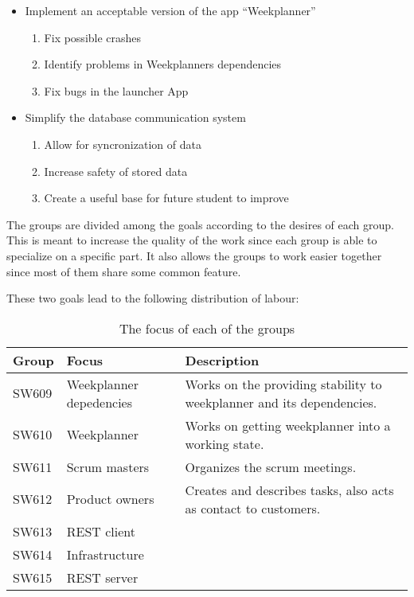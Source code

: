 \begin{itemize}
  \item Implement an acceptable version of the app ``Weekplanner''
  	\begin{enumerate}
  		\item Fix possible crashes
  		\item Identify problems in Weekplanners dependencies
  		\item Fix bugs in the launcher App
	\end{enumerate}
  \item Simplify the database communication system
   	\begin{enumerate}
  		\item Allow for syncronization of data
  		\item Increase safety of stored data
  		\item Create a useful base for future student to improve
	\end{enumerate}
\end{itemize}





The groups are divided among the goals according to the desires of each group.
This is meant to increase the quality of the work since each group is able to
specialize on a specific part. It also allows the groups to work easier together
since most of them share some common feature.

 These two goals lead to the
following distribution of labour:

\begin{table}[H]
\centering
\begin{tabular}{|p{2cm}|p{3cm}|p{8cm}|}
\hline
Group & Focus & Description \\ \hline
SW609 & Weekplanner depedencies & Works on the providing stability to
weekplanner and its dependencies.\\\hline 
SW610 & Weekplanner & Works on getting weekplanner into a working
state.\\
\hline SW611 & Scrum masters & Organizes the scrum meetings. \\\hline 
SW612 & Product owners & Creates and describes tasks, also acts as contact to
customers. \\\hline 
SW613 & REST client & \\ \hline

SW614 & Infrastructure & \\ \hline

SW615 & REST server & \\ \hline

\end{tabular}
\caption{The focus of each of the groups}
\label{GroupDivision}
\end{table}

